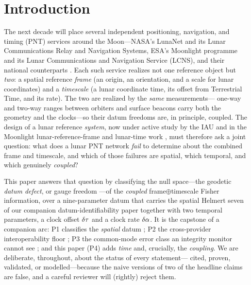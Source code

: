 \renewcommand{\rmoon}{R_{\mathrm{M}}}
\renewcommand{\Umoon}{U_{\mathrm{M}}}
\renewcommand{\gmoon}{g_{\mathrm{M}}}

\section{Introduction}
\label{sec:intro}

The next decade will place several independent positioning, navigation, and timing (PNT)
services around the Moon---NASA's LunaNet and its Lunar Communications Relay and
Navigation Systems, ESA's Moonlight programme and its Lunar Communications and Navigation
Service (LCNS), and their national counterparts \citep{israel2020lunanet,%
fienga2024moonlight,lnis2023}. Each such service realizes not one reference object but
\emph{two}: a spatial reference \emph{frame} (an origin, an orientation, and a scale for
lunar coordinates) and a \emph{timescale} (a lunar coordinate time, its offset from
Terrestrial Time, and its rate). The two are realized by the \emph{same} measurements---%
one-way and two-way ranges between orbiters and surface beacons carry both the geometry
and the clocks---so their datum freedoms are, in principle, coupled. The design of a
lunar reference \emph{system}, now under active study by the IAU and in the Moonlight
lunar-reference-frame and lunar-time work \citep{fienga2024moonlight}, must therefore ask
a joint question: what does a lunar PNT network \emph{fail} to determine about the
combined frame and timescale, and which of those failures are spatial, which temporal,
and which genuinely \emph{coupled}?

This paper answers that question by classifying the null space---the geodetic
\emph{datum defect}, or gauge freedom \citep{baarda1973,teunissen2000}---of the
\emph{coupled} frame$\oplus$timescale Fisher information, over a nine-parameter datum that
carries the spatial Helmert seven of our companion datum-identifiability paper
\citep{baweja2026datum} together with two temporal parameters, a clock offset $\delta\tau$ and
a clock rate $\delta\alpha$. It is the capstone of a companion arc: P1 classifies the
\emph{spatial} datum \citep{baweja2026datum}; P2 the cross-provider interoperability floor
\citep{baweja2026interop}; P3 the common-mode error class an integrity monitor cannot see
\citep{baweja2026commonmode}; and this paper (P4) adds \emph{time} and, crucially, the
\emph{coupling}. We are deliberate, throughout, about the status of every statement---%
cited, proven, validated, or modelled---because the naive versions of two of the headline
claims are false, and a careful reviewer will (rightly) reject them.

